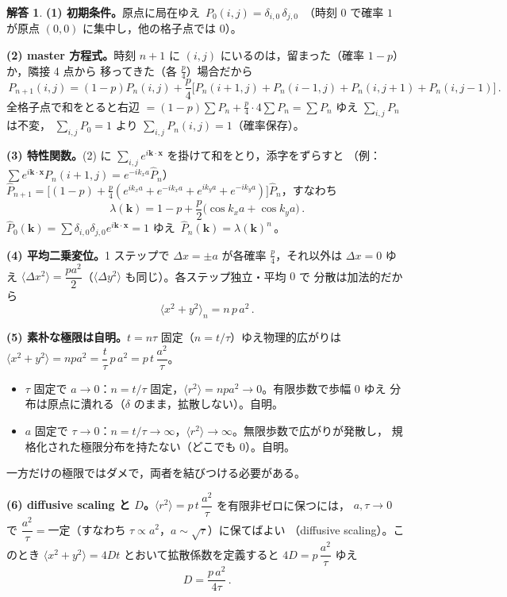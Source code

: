 \documentclass[dvipdfmx, uplatex]{jsarticle}
\newcommand{\bk}{\bm{k}}
\newcommand{\bx}{\bm{x}}
\theoremstyle{definition}
\newtheorem*{sol}{解答}
\begin{document}
\begin{sol}
\textbf{(1) 初期条件。}原点に局在ゆえ $\boxed{\,P_0(i,j)=\delta_{i,0}\,\delta_{j,0}\,}$
（時刻 $0$ で確率 $1$ が原点 $(0,0)$ に集中し，他の格子点では $0$）。

\par\smallskip
\textbf{(2) master 方程式。}時刻 $n+1$ に $(i,j)$ にいるのは，留まった（確率 $1-p$）か，隣接 4 点から
移ってきた（各 $\tfrac p4$）場合だから
\[
    \boxed{\,P_{n+1}(i,j)=(1-p)P_n(i,j)+\frac{p}{4}\bigl[P_n(i{+}1,j)+P_n(i{-}1,j)+P_n(i,j{+}1)+P_n(i,j{-}1)\bigr]\,}.
\]
全格子点で和をとると右辺 $=(1-p)\sum P_n+\tfrac p4\cdot4\sum P_n=\sum P_n$ ゆえ $\sum_{i,j}P_n$ は不変，
$\sum_{i,j}P_0=1$ より $\boxed{\sum_{i,j}P_n(i,j)=1}$（確率保存）。

\par\smallskip
\textbf{(3) 特性関数。}(2) に $\sum_{i,j}e^{i\bk\cdot\bx}$ を掛けて和をとり，添字をずらすと
（例：$\sum e^{i\bk\cdot\bx}P_n(i{+}1,j)=e^{-ik_xa}\hat P_n$）
$\hat P_{n+1}=\bigl[(1-p)+\tfrac p4(e^{ik_xa}+e^{-ik_xa}+e^{ik_ya}+e^{-ik_ya})\bigr]\hat P_n$，すなわち
\[
    \boxed{\,\lambda(\bk)=1-p+\frac{p}{2}\bigl(\cos k_xa+\cos k_ya\bigr)\,}.
\]
$\hat P_0(\bk)=\sum\delta_{i,0}\delta_{j,0}e^{i\bk\cdot\bx}=1$ ゆえ $\boxed{\,\hat P_n(\bk)=\lambda(\bk)^n\,}$。

\par\smallskip
\textbf{(4) 平均二乗変位。}1 ステップで $\Delta x=\pm a$ が各確率 $\tfrac p4$，それ以外は $\Delta x=0$ ゆえ
$\langle\Delta x^2\rangle=\boxed{\dfrac{pa^2}{2}}$（$\langle\Delta y^2\rangle$ も同じ）。各ステップ独立・平均 $0$ で
分散は加法的だから
\[
    \boxed{\,\langle x^2+y^2\rangle_n=n\,p\,a^2\,}.
\]

\par\smallskip
\textbf{(5) 素朴な極限は自明。}$t=n\tau$ 固定（$n=t/\tau$）ゆえ物理的広がりは
$\langle x^2+y^2\rangle=npa^2=\dfrac{t}{\tau}\,p\,a^2=p\,t\,\dfrac{a^2}{\tau}$。
\begin{itemize}
\item[(i)] $\tau$ 固定で $a\to0$：$n=t/\tau$ 固定，$\langle r^2\rangle=npa^2\to\boxed{0}$。有限歩数で歩幅 $0$ ゆえ
分布は原点に潰れる（$\delta$ のまま，拡散しない）。自明。
\item[(ii)] $a$ 固定で $\tau\to0$：$n=t/\tau\to\infty$，$\langle r^2\rangle\to\boxed{\infty}$。無限歩数で広がりが発散し，
規格化された極限分布を持たない（どこでも $0$）。自明。
\end{itemize}
一方だけの極限ではダメで，両者を結びつける必要がある。

\par\smallskip
\textbf{(6) diffusive scaling と $D$。}$\langle r^2\rangle=p\,t\,\dfrac{a^2}{\tau}$ を有限非ゼロに保つには，
$a,\tau\to0$ で $\boxed{\dfrac{a^2}{\tau}=\text{一定}}$（すなわち $\tau\propto a^2$，$a\sim\sqrt\tau$）に保てばよい
（diffusive scaling）。このとき $\langle x^2+y^2\rangle=4Dt$ とおいて拡散係数を定義すると
$4D=p\,\dfrac{a^2}{\tau}$ ゆえ
\[
    \boxed{\,D=\frac{p\,a^2}{4\tau}\,}.
\]


\end{sol}
\end{document}
